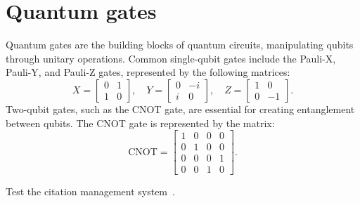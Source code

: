 \documentclass[10pt,article]{IEEEtran}
\begin{document}
\section{Quantum gates}
Quantum gates are the building blocks of quantum circuits, manipulating qubits through unitary operations. Common single-qubit gates include the Pauli-X, Pauli-Y, and Pauli-Z gates, represented by the following matrices:
\begin{equation}
    X = \begin{bmatrix}
        0 & 1 \\
        1 & 0
    \end{bmatrix}, \quad
    Y = \begin{bmatrix}
        0 & -i \\
        i & 0
    \end{bmatrix}, \quad
    Z = \begin{bmatrix}
        1 & 0 \\
        0 & -1
    \end{bmatrix}.
    \label{eq:pauli_gates}
\end{equation}
Two-qubit gates, such as the CNOT gate, are essential for creating entanglement between qubits. The CNOT gate is represented by the matrix:
\begin{equation}
    \text{CNOT} = \begin{bmatrix}
        1 & 0 & 0 & 0 \\
        0 & 1 & 0 & 0 \\
        0 & 0 & 0 & 1 \\
        0 & 0 & 1 & 0
    \end{bmatrix}.
    \label{eq:cnot_gate}
\end{equation}

Test the citation management system~\cite{Chuang2010quantumbook}.



\end{document}
